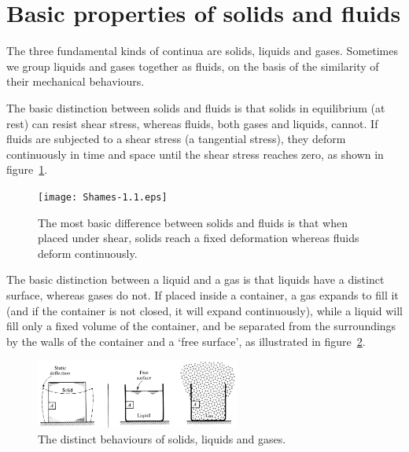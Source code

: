 \documentclass[twoside,11pt]		{report}
\begin{document}
\section{Basic properties of solids and fluids}

The three fundamental kinds of continua are
solids, liquids and gases. Sometimes we group liquids and gases
together as fluids, on the basis of the similarity of their mechanical
behaviours.

The basic distinction between solids and fluids is that solids in
equilibrium (\ie at rest) can resist shear stress, whereas fluids,
both gases and liquids, cannot. If fluids are subjected to a shear
stress (\ie a tangential stress), they deform continuously in time and
space until the shear stress reaches zero, as shown in
figure~\ref{fig.def}.

\begin{figure}
\begin{center}
\texttt{[image: Shames-1.1.eps]}
\end{center}
\caption{The most basic difference between solids and fluids is that
  when placed under shear, solids reach a fixed deformation whereas
  fluids deform continuously.
  \citep[From][]{shames62}}
\label{fig.def}
\end{figure}

The basic distinction between a liquid and a gas is that liquids have
a distinct surface, whereas gases do not. If placed inside a
container, a gas expands to fill it (and if the container is not
closed, it will expand continuously), while a liquid will fill only a
fixed volume of the container, and be separated from the surroundings
by the walls of the container and a `free surface', as illustrated in
figure~\ref{fig.slg}.

\begin{figure}
\begin{center}
\includegraphics[width=0.6\textwidth]{White-1.1.eps}
\end{center}
\caption{The distinct behaviours of solids, liquids and
gases. \citep[From][]{white86}}
\label{fig.slg}
\end{figure}
\end{document}
